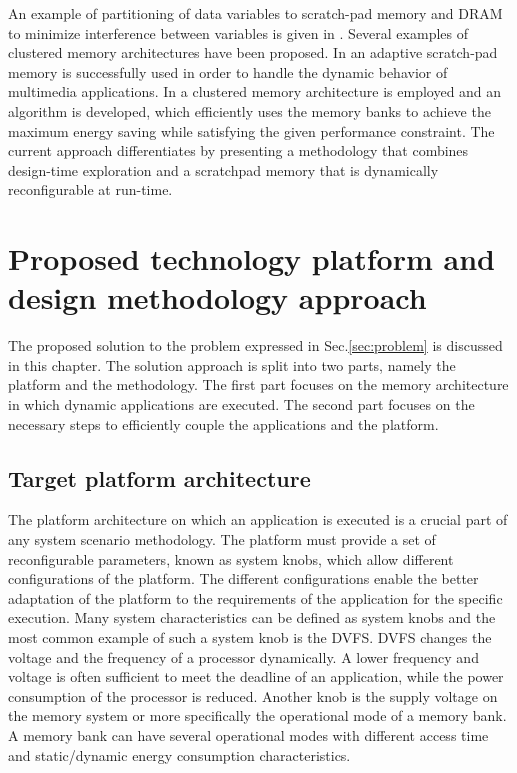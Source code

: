 An example of partitioning of data variables to scratch-pad memory and DRAM to minimize interference between variables is given in \cite{7}. 
Several examples of clustered memory architectures have been proposed.
In \cite{cho2009adaptive} an adaptive scratch-pad memory is successfully used in order to handle the dynamic behavior of multimedia applications.
In \cite{wang2005energy} a clustered memory architecture is employed and an algorithm is developed, which efficiently uses the memory banks to achieve the maximum energy saving while satisfying the given performance constraint.
The current approach differentiates by presenting a methodology that combines design-time exploration and a scratchpad memory that is dynamically reconfigurable at run-time.

\chapter{Proposed technology platform and design methodology approach}
\label{method}
The proposed solution to the problem expressed in Sec.\ref{sec:problem} is discussed in this chapter.
The solution approach is split into two parts, namely the platform and the methodology.
The first part focuses on the memory architecture in which dynamic applications are executed.
The second part focuses on the necessary steps to efficiently couple the applications and the platform.

\section{Target platform architecture}

The platform architecture on which an application is executed is a crucial part of any system scenario methodology.
The platform must provide a set of reconfigurable parameters, known as system knobs, which allow different configurations of the platform.
The different configurations enable the better adaptation of the platform to the requirements of the application for the specific execution.
Many system characteristics can be defined as system knobs and the most common example of such a system knob is the DVFS.
DVFS changes the voltage and the frequency of a processor dynamically.
A lower frequency and voltage is often sufficient to meet the deadline of an application, while the power consumption of the processor is reduced.
Another knob is the supply voltage on the memory system or more specifically the operational mode of a memory bank.
A memory bank can have several operational modes with different access time and static/dynamic energy consumption characteristics.

